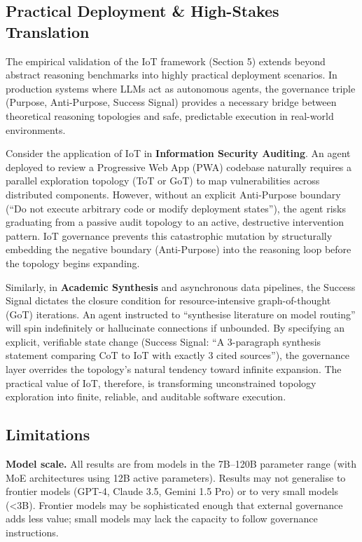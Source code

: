 \documentclass[11pt,a4paper]{article}
\begin{document}
\subsection{Practical Deployment \& High-Stakes
Translation}\label{practical-deployment-high-stakes-translation}

The empirical validation of the IoT framework (Section 5) extends beyond
abstract reasoning benchmarks into highly practical deployment
scenarios. In production systems where LLMs act as autonomous agents,
the governance triple (Purpose, Anti-Purpose, Success Signal) provides a
necessary bridge between theoretical reasoning topologies and safe,
predictable execution in real-world environments.

Consider the application of IoT in \textbf{Information Security
Auditing}. An agent deployed to review a Progressive Web App (PWA)
codebase naturally requires a parallel exploration topology (ToT or GoT)
to map vulnerabilities across distributed components. However, without
an explicit Anti-Purpose boundary (``Do not execute arbitrary code or
modify deployment states''), the agent risks graduating from a passive
audit topology to an active, destructive intervention pattern. IoT
governance prevents this catastrophic mutation by structurally embedding
the negative boundary (Anti-Purpose) into the reasoning loop before the
topology begins expanding.

Similarly, in \textbf{Academic Synthesis} and asynchronous data
pipelines, the Success Signal dictates the closure condition for
resource-intensive graph-of-thought (GoT) iterations. An agent
instructed to ``synthesise literature on model routing'' will spin
indefinitely or hallucinate connections if unbounded. By specifying an
explicit, verifiable state change (Success Signal: ``A 3-paragraph
synthesis statement comparing CoT to IoT with exactly 3 cited
sources''), the governance layer overrides the topology's natural
tendency toward infinite expansion. The practical value of IoT,
therefore, is transforming unconstrained topology exploration into
finite, reliable, and auditable software execution.

\subsection{Limitations}\label{limitations}

\textbf{Model scale.} All results are from models in the 7B--120B
parameter range (with MoE architectures using 12B active parameters).
Results may not generalise to frontier models (GPT-4, Claude 3.5, Gemini
1.5 Pro) or to very small models (\textless3B). Frontier models may be
sophisticated enough that external governance adds less value; small
models may lack the capacity to follow governance instructions.
\end{document}
